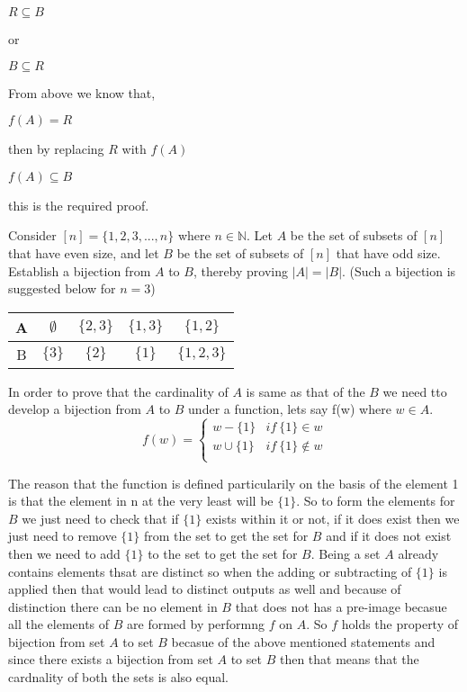 \documentclass[addpoints]{exam}
\begin{document}
\begin{questions}
\begin{solution}
    $R\subseteq B$
    
    or 
    
    $B\subseteq R$
    
    From above we know that,
    
     $f(A)=R$
     
     then by replacing $R$ with $f(A)$
     
     $f(A)\subseteq B$
     
     this is the required proof.
    
  \end{solution}

\question[15] Consider $[n] = \{1,2,3,...,n\}$ where $n \in \mathbb{N}$. Let $A$ be the set of subsets of $[n]$ that have even size, and let $B$ be the set of subsets of $[n]$ that have odd size. Establish a bijection from $A$ to $B$, thereby proving $|A| = |B|$. (Such a bijection is suggested below for $n = 3$) 

\begin{center}

  \begin{tabular}{ |c || c | c | c |c |}
    \hline
 A & $\emptyset$ & $\{2,3\}$ & $\{1,3\}$ & $\{1,2\}$ \\ \hline
 B & $\{3\}$ & $\{2\}$ & $\{1\}$ & $\{1,2,3\}$\\\hline
\end{tabular}
\end{center}

  \begin{solution}
    
    In order to prove that the cardinality of $A$ is same as that of the $B$ we need tto develop a bijection from $A$ to $B$ under a function, lets say f(w) where $w \in A$.
    $$
    f(w)=
    \begin{cases}
     w-\{1\} & if \ \{1\} \in w  \\
     w\cup \{1\} & if \ \{1\} \not \in w \\ 
   \end{cases}
   $$
    
    The reason that the function is defined particularily on the basis of the element 1 is that the element in n at the very least will be $\{1\}$. So to form the elements for $B$ we just need to check that if $\{1\}$ exists within it or not, if it does exist then we just need to remove $\{1\}$ from the set to get the set for $B$ and if it does not exist then we need to add $\{1\}$ to the set to get the set for $B$. Being a set $A$ already contains elements thsat are distinct so when the adding or subtracting of $\{1\}$ is applied then that would lead to distinct outputs as well and because of distinction there can be no element in $B$ that does not has a pre-image becasue all the elements of $B$ are formed by performng $f$ on $A$.
    So $f$ holds the property of bijection from set $A$ to set $B$ becasue of the above mentioned statements and since there exists a bijection from set $A$ to set $B$ then that means that the cardnality of both the sets is also equal.
  \end{solution}
  

\end{questions}
\end{document}
